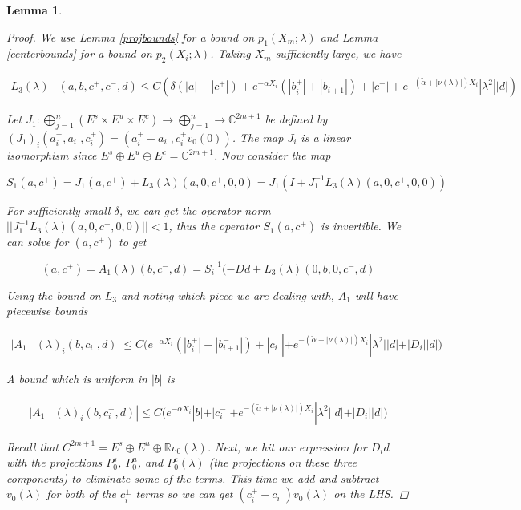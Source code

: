 \documentclass[12pt]{article}
\def\R{{\mathbb R}}
\def\C{{\mathbb C}}
\newtheorem{lemma}{Lemma}
\begin{document}
\begin{lemma}
\begin{proof}
We use Lemma \ref{projbounds} for a bound on $p_1(X_m; \lambda)$ and Lemma \ref{centerbounds} for a bound on $p_2(X_i; \lambda)$. Taking $X_m$ sufficiently large, we have

\begin{align*}
L_3(\lambda)&(a, b, c^+, c^-, d)\leq C (\delta (|a| + |c^+|) + e^{-\alpha X_i}(|b_i^+| + |b_{i+1}^-|) + |c^-| + e^{-(\tilde{\alpha}+|\nu(\lambda)|) X_i} |\lambda^2| |d|)
\end{align*}

Let $J_1: \bigoplus_{j=1}^n (E^s \times E^u \times E^c) \rightarrow \bigoplus_{j=1}^n \rightarrow \C^{2m+1}$ be defined by $(J_1)_i(a_i^+, a_i^-, c_i^+) = (a_i^+ - a_i^-, c_i^+ v_0(0) )$. The map $J_i$ is a linear isomorphism since $E^s \oplus E^u \oplus E^c = \C^{2m + 1}$. Now consider the map

\[
S_1(a, c^+) = J_1 (a, c^+) + L_3(\lambda)(a, 0, c^+, 0, 0) = J_1( I + J_1^{-1} L_3(\lambda)(a, 0, c^+, 0, 0))
\]

For sufficiently small $\delta$, we can get the operator norm $||J_1^{-1} L_3(\lambda)(a, 0, c^+, 0, 0)|| < 1$, thus the operator $S_1(a, c^+)$ is invertible. We can solve for $(a, c^+)$ to get

\[
(a, c^+) = A_1(\lambda)(b, c^-, d) = S_i^{-1}(-D d + L_3(\lambda)(0, b, 0, c^-, d)
\]

Using the bound on $L_3$ and noting which piece we are dealing with, $A_1$ will have piecewise bounds

\begin{align*}
|A_1&(\lambda)_i(b, c_i^-, d)|
\leq C \Big( e^{-\alpha X_i} (|b_i^+| + |b_{i+1}^-|) + |c_i^-| + e^{-(\tilde{\alpha}+|\nu(\lambda)|) X_i} |\lambda^2| |d| + |D_i||d| \Big)
\end{align*} 

A bound which is uniform in $|b|$ is 

\begin{align*}
|A_1&(\lambda)_i(b, c_i^-, d)|
\leq C \Big( e^{-\alpha X_i} |b| + |c_i^-| + e^{-(\tilde{\alpha}+|\nu(\lambda)|) X_i} |\lambda^2| |d| + |D_i||d| \Big)
\end{align*} 

Recall that $C^{2m+1} = E^s \oplus E^u \oplus \R v_0(\lambda)$. Next, we hit our expression for $D_i d$ with the projections $P^s_0$, $P^u_0$, and $P^c_0(\lambda)$ (the projections on these three components) to eliminate some of the terms. This time we add and subtract $v_0(\lambda)$ for both of the $c_i^\pm$ terms so we can get $(c_i^+ - c_i^-)v_0(\lambda)$ on the LHS.


\end{proof}
\end{lemma}
\end{document}
